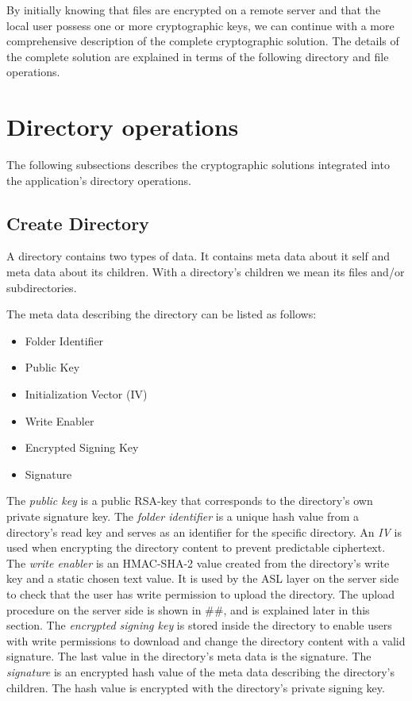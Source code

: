 \documentclass[pdftex,english,10pt,b5paper,twoside]{book}
\begin{document}
By initially knowing that files are encrypted on a remote server and that the local user
possess one or more cryptographic keys, we can continue with a more comprehensive
description of the complete cryptographic solution. The details of the complete
solution are explained in terms of the following directory and file operations.

\section{Directory operations}
\label{sec:CS:DO}
The following subsections describes the cryptographic solutions integrated into
the application's directory operations.

\subsection{Create Directory}
A directory contains two types of data. It contains meta data about it
self and meta data about its children. With a directory's children we mean
its files and/or subdirectories. 

The meta data describing the directory can be listed as follows:
\begin{itemize}
\item Folder Identifier
\item Public Key
\item Initialization Vector (IV)
\item Write Enabler
\item Encrypted Signing Key
\item Signature
\end{itemize}
The \emph{public key} is a public RSA-key that corresponds to the directory's
own private signature key. The \emph{folder identifier} is a unique hash value
from a directory's read key and serves as an identifier for the specific
directory. An \emph{IV} is used when encrypting the directory content to prevent
predictable ciphertext. The \emph{write enabler} is an HMAC-SHA-2 value created
from the directory's write key and a static chosen text value. It is used by the
ASL layer on the server side to check that the user has write permission to
upload the directory. The upload procedure on the server side is shown in \#\#,
and is explained later in this section. The \emph{encrypted signing key} is
stored inside the directory to enable users with write permissions to download
and change the directory content with a valid signature. The last value in the
directory's meta data is the signature. The \emph{signature} is an encrypted
hash value of the meta data describing the directory's children. The hash value
is encrypted with the directory's private signing key. 
\end{document}
